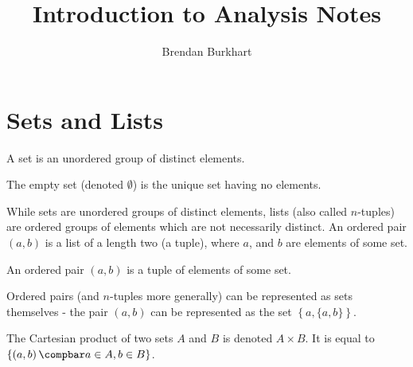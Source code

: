 \documentclass[12pt]{article}
\begin{document}
\title{Introduction to Analysis Notes}
\date{}
\author{Brendan Burkhart}
\maketitle

\tableofcontents
\newpage

\section{Sets and Lists}

\begin{defn}\label{set}
    A set is an unordered group of distinct elements.
\end{defn}

\begin{defn}\label{empty-set}
    The empty set (denoted $\emptyset$) is the unique set having no elements.
\end{defn}

While sets are unordered groups of distinct elements, lists (also called $n$-tuples) are ordered groups of elements which are not necessarily distinct. An ordered pair $(a, b)$ is a list of a length two (a tuple), where $a$, and $b$ are elements of some set. 

\begin{defn}\label{tuple}
    An ordered pair $(a, b)$ is a tuple of elements of some set.
\end{defn}

Ordered pairs (and $n$-tuples more generally) can be represented as sets themselves - the pair $(a, b)$ can be represented as the set $\left\{a, \{a, b\}\right\}$.

\begin{defn}\label{cartesian-product}
    The Cartesian product of two sets $A$ and $B$ is denoted $A \times B$. It is equal to $\left\{\left(a, b\right) \compbar a \in A, b \in B \right\}$.
\end{defn}
\end{document}
